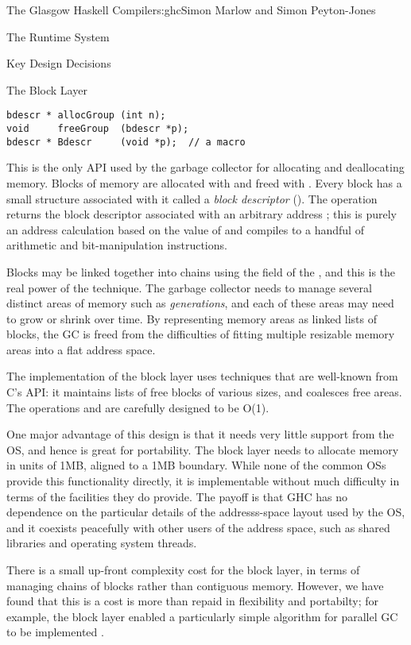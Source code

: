 \begin{aosachapter}{The Glasgow Haskell Compiler}{s:ghc}{Simon Marlow and Simon Peyton-Jones}
\begin{aosasect1}{The Runtime System}
\begin{aosasect2}{Key Design Decisions}
\begin{aosasect3}{The Block Layer}
\begin{verbatim}
bdescr * allocGroup (int n);
void     freeGroup  (bdescr *p);
bdescr * Bdescr     (void *p);  // a macro
\end{verbatim}

This is the only API used by the garbage collector for allocating and
deallocating memory.  Blocks of memory are allocated with
 and freed with .  Every block has a
small structure associated with it called a \emph{block descriptor}
().  The operation  returns the block
descriptor associated with an arbitrary address ; this is
purely an address calculation based on the value of  and
compiles to a handful of arithmetic and bit-manipulation instructions.

Blocks may be linked together into chains using the  field
of the , and this is the real power of the technique.
The garbage collector needs to manage several distinct areas of memory
such as \emph{generations}, and each of these areas may need to grow
or shrink over time.  By representing memory areas as linked lists of
blocks, the GC is freed from the difficulties of fitting multiple
resizable memory areas into a flat address space.

The implementation of the block layer uses techniques that are
well-known from C's  API: it maintains lists of
free blocks of various sizes, and coalesces free areas.  The
operations  and  are carefully
designed to be O(1).

One major advantage of this design is that it needs very little
support from the OS, and hence is great for portability.  The block
layer needs to allocate memory in units of 1MB, aligned to a 1MB
boundary.  While none of the common OSs provide this functionality
directly, it is implementable without much difficulty in terms of the
facilities they do provide.  The payoff is that GHC has no dependence
on the particular details of the addresss-space layout used by the OS,
and it coexists peacefully with other users of the address space, such
as shared libraries and operating system threads.

There is a small up-front complexity cost for the block layer, in
terms of managing chains of blocks rather than contiguous memory.
However, we have found that this is a cost is more than repaid in
flexibility and portabilty; for example, the block layer enabled a
particularly simple algorithm for parallel GC to be implemented
\cite{bib:parallel-gc}.


\end{aosasect3}
\end{aosasect2}
\end{aosasect1}
\end{aosachapter}
